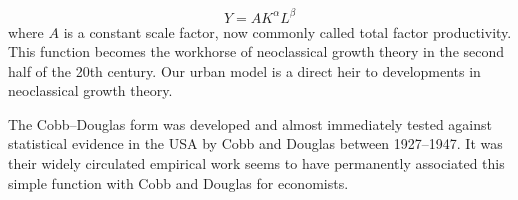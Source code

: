  \[Y=AK^\alpha L^\beta\]
 where $A$ is a constant scale factor, now commonly called \gls{total factor productivity}. This function becomes the workhorse of neoclassical growth theory in the second half  of the 20th century. Our urban model is a direct heir to developments in neoclassical growth theory.
 


The Cobb–Douglas form was developed and almost immediately tested against statistical evidence in the USA by Cobb and Douglas between 1927–1947. It was  their widely circulated empirical work seems to have permanently associated this simple function with Cobb and Douglas for economists.






